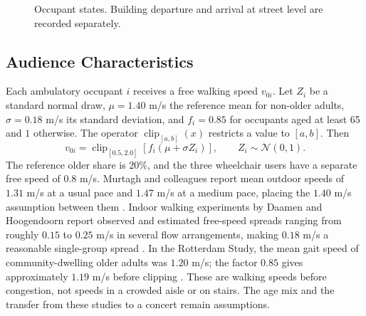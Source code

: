 \documentclass[11pt,a4paper]{article}
\newcommand{\clip}{\operatorname{clip}}
\begin{document}
\begin{figure}[htbp]
\centering
{}
\caption{Occupant states. Building departure and arrival at street level are recorded separately.}
\label{fig:states}
\end{figure}

\subsection{Audience Characteristics}

Each ambulatory occupant $i$ receives a free walking speed $v_{0i}$. Let $Z_i$ be a standard normal draw, $\mu=1.40$ m/s the reference mean for non-older adults, $\sigma=0.18$ m/s its standard deviation, and $f_i=0.85$ for occupants aged at least 65 and $1$ otherwise. The operator $\clip_{[a,b]}(x)$ restricts a value to $[a,b]$. Then
\begin{equation}\label{eq:speed}
v_{0i}=\clip_{[0.5,2.0]}\!\left[f_i(\mu+\sigma Z_i)\right],
\qquad Z_i\sim\mathcal N(0,1).
\end{equation}
The reference older share is $20\%$, and the three wheelchair users have a separate free speed of $0.8$ m/s. Murtagh and colleagues report mean outdoor speeds of $1.31$ m/s at a usual pace and $1.47$ m/s at a medium pace, placing the $1.40$ m/s assumption between them \cite{murtagh}. Indoor walking experiments by Daamen and Hoogendoorn report observed and estimated free-speed spreads ranging from roughly $0.15$ to $0.25$ m/s in several flow arrangements, making $0.18$ m/s a reasonable single-group spread \cite{daamen}. In the Rotterdam Study, the mean gait speed of community-dwelling older adults was $1.20$ m/s; the factor $0.85$ gives approximately $1.19$ m/s before clipping \cite{dommers,bohannon}. These are walking speeds before congestion, not speeds in a crowded aisle or on stairs. The age mix and the transfer from these studies to a concert remain assumptions.
\end{document}
